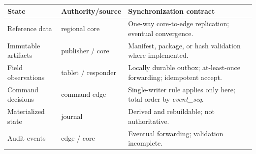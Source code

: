 





\scriptsize
\setlength{\tabcolsep}{3pt}
\begin{tabularx}{\columnwidth}{@{}p{}p{}X@{}}
\toprule
\textbf{State} & \textbf{Authority/source} & \textbf{Synchronization contract} \\
\midrule
Reference data & regional core & One-way core-to-edge replication; eventual convergence. \\
Immutable artifacts & publisher / core & Manifest, package, or hash validation where implemented. \\
Field observations & tablet / responder & Locally durable outbox; at-least-once forwarding; idempotent accept. \\
Command decisions & command edge & Single-writer rule applies only here; total order by \textit{event\_seq}. \\
Materialized state & journal & Derived and rebuildable; not authoritative. \\
Audit events & edge / core & Eventual forwarding; validation incomplete. \\
\bottomrule
\end{tabularx}